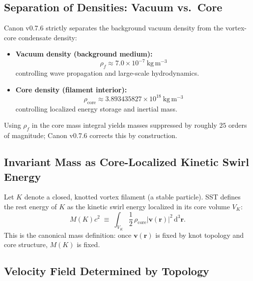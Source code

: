 \documentclass[10pt]{article}
\newcommand{\rhof}{\rho_{\!f}}                           %
\newcommand{\rhocore}{\rho_{\text{core}}}
\begin{document}
    \subsection{Separation of Densities: Vacuum vs.\ Core}

        Canon v0.7.6 strictly separates the background vacuum density from the vortex-core
        condensate density:

        \begin{itemize}
            \item \textbf{Vacuum density (background medium):}
            \[
                \rhof \approx 7.0\times 10^{-7}\ \mathrm{kg\,m^{-3}}
            \]
            controlling wave propagation and large-scale hydrodynamics.
            \item \textbf{Core density (filament interior):}
            \[
                \rhocore \approx 3.893435827\times 10^{18}\ \mathrm{kg\,m^{-3}}
            \]
            controlling localized energy storage and inertial mass.
        \end{itemize}

        Using $\rhof$ in the core mass integral yields masses suppressed by roughly
        $25$ orders of magnitude; Canon v0.7.6 corrects this by construction.

    \subsection{Invariant Mass as Core-Localized Kinetic Swirl Energy}

        Let $K$ denote a closed, knotted vortex filament (a stable particle). SST defines
        the rest energy of $K$ as the kinetic swirl energy localized in its core volume
        $V_K$:
        \begin{equation}
            M(K)c^2
            \;\equiv\;
            \int_{V_K}
            \frac{1}{2}\,\rhocore
            \left|\mathbf{v}(\mathbf{r})\right|^2
            \,\mathrm{d}^3\mathbf{r}.
            \label{eq:mass_def_exact}
        \end{equation}
        This is the canonical mass definition: once $\mathbf{v}(\mathbf{r})$ is fixed by
        knot topology and core structure, $M(K)$ is fixed.

    \subsection{Velocity Field Determined by Topology}
\end{document}
